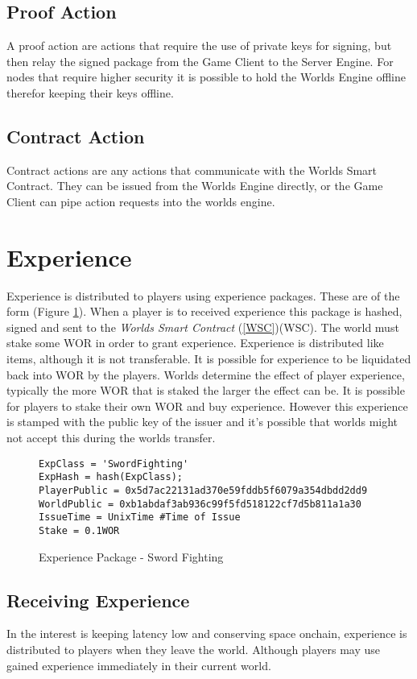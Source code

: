 \documentclass[runningheads,a4paper]{llncs}
\begin{document}
\subsection{Proof Action}
A proof action are actions that require the use of private keys for signing, but then relay the signed package from the Game Client to the Server Engine. For nodes that require higher security it is possible to hold the Worlds Engine offline therefor keeping their keys offline. 

\subsection{Contract Action}
Contract actions are any actions that communicate with the Worlds Smart Contract. They can be issued from the Worlds Engine directly, or the Game Client can pipe action requests into the worlds engine. 

\section{Experience}
\label{exp}
Experience is distributed to players using experience packages. These are of the form (Figure \ref{exppkg}). When a player is to received experience this package is hashed, signed and sent to the \textit{Worlds Smart Contract} (\ref{WSC})(WSC). The world must stake some WOR in order to grant experience. Experience is distributed like items, although it is not transferable. It is possible for experience to be liquidated back into WOR by the players. Worlds determine the effect of player experience, typically the more WOR that is staked the larger the effect can be. It is possible for players to stake their own WOR and buy experience. However this experience is stamped with the public key of the issuer and it's possible that worlds might not accept this during the worlds transfer. 


\begin{figure}[H]
\centering
\caption{Experience Package - Sword Fighting}
\label{exppkg}
\begin{lstlisting}
ExpClass = 'SwordFighting'
ExpHash = hash(ExpClass);
PlayerPublic = 0x5d7ac22131ad370e59fddb5f6079a354dbdd2dd9
WorldPublic = 0xb1abdaf3ab936c99f5fd518122cf7d5b811a1a30
IssueTime = UnixTime #Time of Issue
Stake = 0.1WOR
\end{lstlisting}
\end{figure}

\subsection{Receiving Experience} 
In the interest is keeping latency low and conserving space onchain, experience is distributed to players when they leave the world. Although players may use gained experience immediately in their current world.
\end{document}
